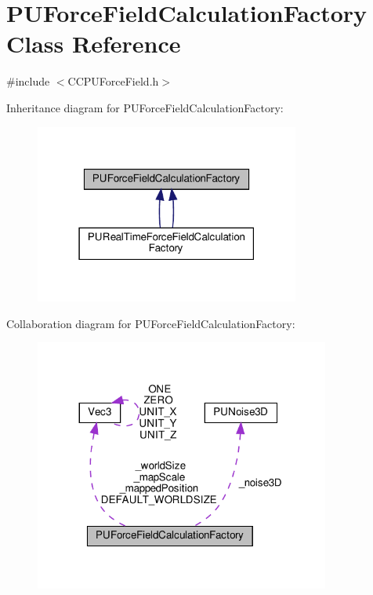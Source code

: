 \hypertarget{classPUForceFieldCalculationFactory}{}\section{P\+U\+Force\+Field\+Calculation\+Factory Class Reference}
\label{classPUForceFieldCalculationFactory}


{\ttfamily \#include $<$C\+C\+P\+U\+Force\+Field.\+h$>$}



Inheritance diagram for P\+U\+Force\+Field\+Calculation\+Factory\+:
\nopagebreak
\begin{figure}[H]
\begin{center}
\leavevmode
\includegraphics[width=247pt]{classPUForceFieldCalculationFactory__inherit__graph}
\end{center}
\end{figure}


Collaboration diagram for P\+U\+Force\+Field\+Calculation\+Factory\+:
\nopagebreak
\begin{figure}[H]
\begin{center}
\leavevmode
\includegraphics[width=275pt]{classPUForceFieldCalculationFactory__coll__graph}
\end{center}
\end{figure}
